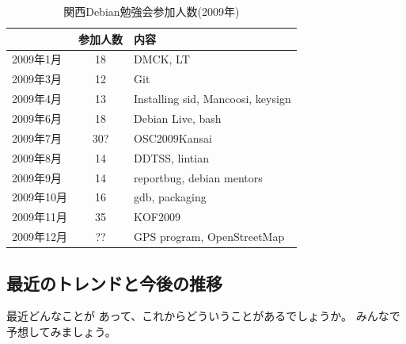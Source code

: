 \documentclass[mingoth,a4paper]{jsarticle}
\begin{document}
\begin{table}
\begin{minipage}{0.5\hsize}
\end{minipage}
\begin{minipage}{0.5\hsize}
 \caption{関西Debian勉強会参加人数(2009年)}\label{tab:count2009kansai}
 \begin{center}
  \begin{tabular}{|l|c|p{10em}|}
 \hline
 & 参加人数 & 内容 \\
 \hline
2009年1月 & 18 & DMCK, LT \\
2009年3月 & 12 & Git \\
2009年4月 & 13 & Installing sid, Mancoosi, keysign \\
2009年6月 & 18 & Debian Live, bash\\
2009年7月 & 30? & OSC2009Kansai \\
2009年8月 & 14 & DDTSS, lintian \\
2009年9月 & 14 & reportbug, debian mentors\\
2009年10月 & 16 & gdb, packaging \\
2009年11月 & 35 & KOF2009 \\
2009年12月 & ?? & GPS program, OpenStreetMap \\
 \hline
  \end{tabular}
 \end{center}
\end{minipage}
\end{table}


\subsection{最近のトレンドと今後の推移}

最近どんなことが
あって、これからどういうことがあるでしょうか。
みんなで予想してみましょう。
\end{document}
